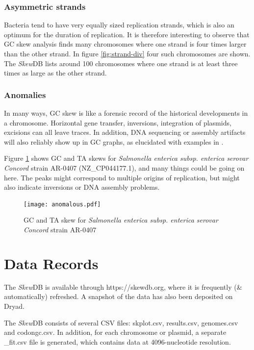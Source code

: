 \documentclass[fleqn,10pt]{wlscirep}
\begin{document}
\subsubsection*{Asymmetric strands}
Bacteria tend to have very equally sized replication strands, which is also an optimum for the duration of replication. It is therefore interesting to observe that GC skew analysis finds many chromosomes where one strand is four times larger than the other strand.  In  figure \ref{fig:strand-div} four such chromosomes are shown. The \emph{Skew}DB lists around 100 chromosomes where one strand is at least three times as large as the other strand.


\subsubsection*{Anomalies}
In many ways, GC skew is like a forensic record of the historical developments in a chromosome. Horizontal gene transfer, inversions, integration of plasmids, excisions can all leave traces. In addition, DNA sequencing or assembly artifacts will also reliably show up in GC graphs, as elucidated with examples in \cite{lu_skewit_2020}.

Figure \ref{fig:anomalous} shows GC and TA skews for \emph{Salmonella enterica subsp. enterica serovar Concord} strain AR-0407 (NZ\_CP044177.1), and many things could be going on here. The peaks might correspond to multiple origins of replication, but might also indicate inversions or DNA assembly problems.

\begin{figure}[ht]
\centering
\texttt{[image: anomalous.pdf]}
\caption{GC and TA skew for \emph{Salmonella enterica subsp. enterica serovar Concord} strain AR-0407}
\label{fig:anomalous}
\end{figure}

\section*{Data Records}
The \emph{Skew}DB is available through https://skewdb.org, where it is frequently (\& automatically) refreshed. A snapshot of the data has also been deposited on Dryad\cite{https://doi.org/10.5061/dryad.g4f4qrfr6}.

The \emph{Skew}DB consists of several CSV files: skplot.csv, results.csv, genomes.csv and codongc.csv.
In addition, for each chromosome or plasmid, a separate \_fit.csv file is generated, which contains data at 4096-nucleotide resolution.
\end{document}
